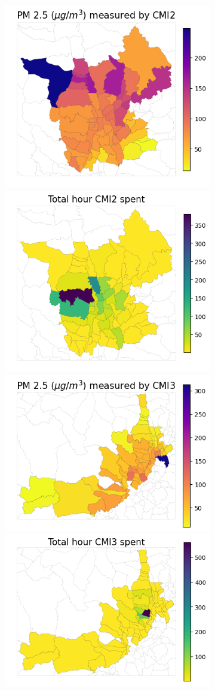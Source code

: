\documentclass[sigconf,screen,natbib=true]{acmart}
\begin{document}
\begin{figure}
\begin{subfigure}[t]{0.49\textwidth}
        \includegraphics[width=.5\linewidth]{figures/map/CMI2_PM25.png}\includegraphics[width=.5\linewidth]{figures/map/CMI2_time.png}
        \includegraphics[width=.5\linewidth]{figures/map/CMI3_PM25.png}\includegraphics[width=.5\linewidth]{figures/map/CMI3_time.png}

\end{subfigure}
\end{figure}
\end{document}
